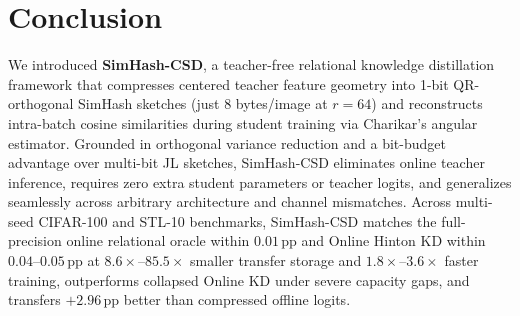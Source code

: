 \documentclass{article}
\begin{document}
\section{Conclusion}
\label{sec:conclusion}

We introduced \textbf{SimHash-CSD}, a teacher-free relational knowledge distillation framework that compresses centered teacher feature geometry into 1-bit QR-orthogonal SimHash sketches (just 8 bytes/image at $r=64$) and reconstructs intra-batch cosine similarities during student training via Charikar's angular estimator. Grounded in orthogonal variance reduction and a bit-budget advantage over multi-bit JL sketches, SimHash-CSD eliminates online teacher inference, requires zero extra student parameters or teacher logits, and generalizes seamlessly across arbitrary architecture and channel mismatches. Across multi-seed CIFAR-100 and STL-10 benchmarks, SimHash-CSD matches the full-precision online relational oracle within $0.01$\,pp and Online Hinton KD within $0.04$--$0.05$\,pp at $8.6\times$--$85.5\times$ smaller transfer storage and $1.8\times$--$3.6\times$ faster training, outperforms collapsed Online KD under severe capacity gaps, and transfers $+2.96$\,pp better than compressed offline logits.



\end{document}
